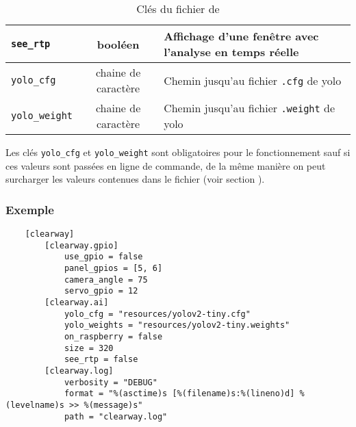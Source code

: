 \begin{table}[H]
\begin{tabularx}{\linewidth}{|l|c|X|}
        \texttt{see\_rtp}                                    & booléen                                             & Affichage d'une fenêtre avec l'analyse en temps réelle     \\ \hline
        \texttt{yolo\_cfg}                                   & chaine de caractère                                 & Chemin jusqu'au fichier \texttt{.cfg} de \gls{yolo}        \\ \hline
        \texttt{yolo\_weight}                                & chaine de caractère                                 & Chemin jusqu'au fichier \texttt{.weight} de \gls{yolo}     \\ \hline
    \end{tabularx}
    \caption{Clés du fichier  de }
\end{table}

Les clés \texttt{yolo\_cfg} et \texttt{yolo\_weight} sont obligatoires pour le fonctionnement sauf si ces valeurs sont
passées en ligne de commande, de la même manière on peut surcharger les valeurs contenues dans le fichier
(voir section ).\newline

\subsubsection{Exemple}

\begin{verbatim}
    [clearway]
        [clearway.gpio]
            use_gpio = false
            panel_gpios = [5, 6]
            camera_angle = 75
            servo_gpio = 12
        [clearway.ai]
            yolo_cfg = "resources/yolov2-tiny.cfg"
            yolo_weights = "resources/yolov2-tiny.weights"
            on_raspberry = false
            size = 320
            see_rtp = false
        [clearway.log]
            verbosity = "DEBUG"
            format = "%(asctime)s [%(filename)s:%(lineno)d] %(levelname)s >> %(message)s"
            path = "clearway.log"
\end{verbatim}